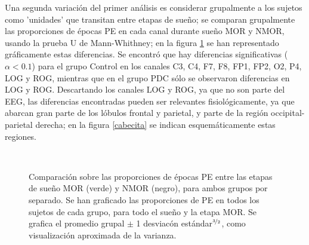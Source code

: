 \documentclass[12pt,a4paper]{mitthesis}
\begin{document}
Una segunda variaci\'on del primer an\'alisis es considerar grupalmente a los sujetos como 
'unidades' que transitan entre etapas de sue\~no; se comparan grupalmente las proporciones de 
\'epocas PE en cada canal durante sue\~no MOR y NMOR, usando la prueba U de Mann-Whithney; en 
la figura \ref{comparacion_verde} se han representado gr\'aficamente estas diferencias.
Se encontr\'o que hay diferencias significativas ($\alpha<0.1$) para el grupo Control en los 
canales C3, C4, F7, F8, FP1, FP2, O2, P4, LOG y ROG, mientras que en el grupo PDC s\'olo se
observaron diferencias en LOG y ROG.
Descartando los canales LOG y ROG, ya que no son parte del EEG, las diferencias encontradas pueden 
ser relevantes fisiol\'ogicamente, ya que abarcan gran parte de los l\'obulos frontal y parietal, 
y parte de la regi\'on occipital-parietal derecha; en la figura \ref{cabecita} se indican 
esquem\'aticamente estas regiones.

\begin{figure}
\centering
{}\\
\caption{Comparaci\'on sobre las proporciones de \'epocas PE entre las etapas de sue\~no MOR 
(verde) y NMOR (negro), para ambos grupos por separado. Se han graficado las proporciones de PE en 
todos los sujetos de cada grupo, para todo el sue\~no y la etapa MOR.
Se grafica el promedio grupal $\pm$ 1 desviac\'on est\'andar$^{\nicefrac{3}{2}}$, como 
visualizaci\'on aproximada de la varianza.}
\label{comparacion_verde}
\end{figure}
\end{document}
